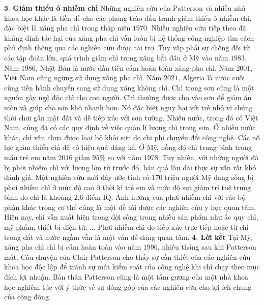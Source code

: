 \begin{multicols}{2}
	\vskip 0.1cm
	\textbf{\color{timhieukhoahoc}$\pmb{3.}$ Giảm thiểu ô nhiễm chì}
	\vskip 0.1cm
	Những nghiên cứu của Patterson và nhiều nhà khoa học khác là tiền đề cho các phong trào đấu tranh giảm thiểu ô nhiễm chì, đặc biệt là xăng pha chì trong thập niên $1970$. Nhiều nghiên cứu tiếp theo đã khẳng định tác hại của xăng pha chì vẫn luôn bị hệ thống công nghiệp tìm cách phủ định thông qua các nghiên cứu được tài trợ. Tuy vấp phải sự chống đối từ các tập đoàn lớn, quá trình giảm chì trong xăng bắt đầu ở Mỹ vào năm $1983$. Năm $1986$, Nhật Bản là nước đầu tiên cấm hoàn toàn xăng pha chì. Năm $2001$, Việt Nam cũng ngừng sử dụng xăng pha chì. Năm $2021$, Algeria là nước cuối cùng tiến hành chuyển sang sử dụng xăng không chì.
	\vskip 0.1cm
	Chì trong sơn cũng là một nguồn gây ngộ độc chì cho con người. Chì thường được cho vào sơn để giảm ăn mòn và giúp cho sơn khô nhanh hơn. Nó đặc biệt nguy hại với trẻ nhỏ vì chúng thời chơi gần mặt đất và dễ tiếp xúc với sơn tường. Nhiều nước, trong đó có Việt Nam, cũng đã có các quy định về việc quản lí lượng chì trong sơn. Ở nhiều nước khác, chì vẫn chưa được loại bỏ khỏi sơn do chi phí chuyển đổi công nghệ.
	\vskip 0.1cm
	Các nỗ lực giảm thiểu chì đã có hiệu quả đáng kể. Ở Mỹ, nồng độ chì trung bình trong máu trẻ em năm $2016$ giảm $95\%$ so với năm $1978$. Tuy nhiên, với những người đã bị phơi nhiễm chì với lượng lớn từ trước đó, hậu quả lâu dài thực sự vẫn rất khó đánh giá. Một nghiên cứu mới đây ước tính có $170$ triệu người Mỹ đang sống bị phơi nhiễm chì ở mức độ cao ở thời kì trẻ em và mức độ sụt giảm trí tuệ trung bình do chì là khoảng $2{.}6$ điểm IQ. Ảnh hưởng của phơi nhiễm chì với các bộ phận khác trong cơ thể cũng là một đề tài được các nghiên cứu y học quan tâm.
	\vskip 0.1cm
	Hiện nay, chì vẫn xuất hiện trong đời sống trong nhiều sản phẩm như ắc quy chì, mỹ phẩm, thiết bị điện tử, ... Phơi nhiễm chì do tiếp xúc trực tiếp hoặc từ chì trong đất và nước ngầm vẫn là một vấn đề đáng quan tâm.
	\vskip 0.1cm
	\textbf{\color{timhieukhoahoc}$\pmb{4.}$ Lời kết}
	\vskip 0.1cm
	Tại Mỹ, xăng pha chì chỉ bị cấm hoàn toàn vào năm $1996$, nhiều tháng sau khi Patterson mất. Câu chuyện của Clair Patterson cho thấy sự cần thiết của các nghiên cứu khoa học độc lập để tránh sự mất kiểm soát của công nghệ khi chỉ chạy theo mục đích lợi nhuận. Bản thân Patterson cũng là một tấm gương của một nhà khoa học nghiêm túc với ý thức về sự đóng góp của các nghiên cứu cho lợi ích chung của cộng đồng.
	\begin{figure}[H]
		\vspace*{5pt}
		\centering
		\captionsetup{labelformat= empty, justification=centering}

\end{figure}
\end{multicols}
